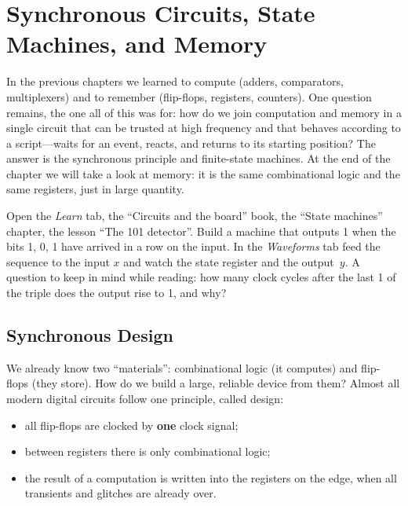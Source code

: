 \chapter{Synchronous Circuits, State Machines, and Memory}
\label{ch:sync}

In the previous chapters we learned to compute (adders, comparators,
multiplexers) and to remember (flip-flops, registers, counters). One question
remains, the one all of this was for: how do we join computation and memory in
a single circuit that can be trusted at high frequency and that behaves
according to a script---waits for an event, reacts, and returns to its
starting position? The answer is the synchronous principle and finite-state
machines. At the end of the chapter we will take a look at memory: it is the
same combinational logic and the same registers, just in large quantity.

\begin{buildbox}
Open the \emph{Learn} tab, the ``Circuits and the board'' book, the ``State
machines'' chapter, the lesson ``The 101 detector''. Build a machine that
outputs 1 when the bits 1, 0, 1 have arrived in a row on the input. In the
\emph{Waveforms} tab feed the sequence  to the input $x$ and
watch the state register and the output~$y$. A question to keep in mind while
reading: how many clock cycles after the last 1 of the triple does the output
rise to 1, and why?
\end{buildbox}

\section{Synchronous Design}

We already know two ``materials'': combinational logic (it computes) and
flip-flops (they store). How do we build a large, reliable device from them?
Almost all modern digital circuits follow one principle, called
 design:

\begin{itemize}
  \item all flip-flops are clocked by \textbf{one} clock signal;
  \item between registers there is only combinational logic;
  \item the result of a computation is written into the registers on the edge,
        when all transients and glitches are already over.
\end{itemize}

